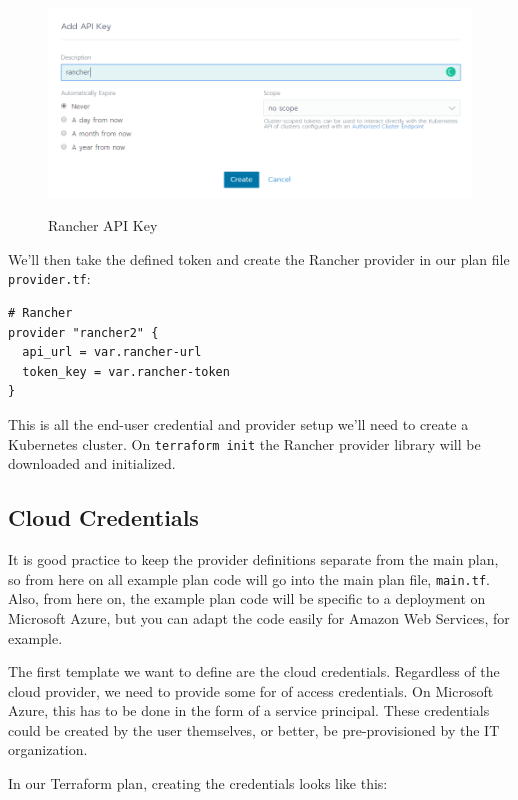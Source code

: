 \begin{figure}[H]
\centering
\caption {Rancher API Key}
\includegraphics[width=\linewidth]{images/rancher-api-key.png}
\label{fig:rancherAPI}
\end{figure}

We'll then take the defined token and create the Rancher provider in our plan file \verb|provider.tf|:

\begin{lstlisting}[caption=Rancher Provider, frame=single, basicstyle=\ttfamily]
# Rancher
provider "rancher2" {
  api_url = var.rancher-url
  token_key = var.rancher-token
}
\end{lstlisting}

This is all the end-user credential and provider setup we'll need to create a Kubernetes cluster. On \verb|terraform init| the Rancher provider library will be downloaded and initialized. 

\subsection{Cloud Credentials}

It is good practice to keep the provider definitions separate from the main plan, so from here on all example plan code will go into the main plan file, \verb|main.tf|. Also, from here on, the example plan code will be specific to a deployment on Microsoft Azure, but you can adapt the code easily for Amazon Web Services, for example.

The first template we want to define are the cloud credentials. Regardless of the cloud provider, we need to provide some for of access credentials. On Microsoft Azure, this has to be done in the form of a service principal. These credentials could be created by the user themselves, or better, be pre-provisioned by the IT organization.

In our Terraform plan, creating the credentials looks like this:

